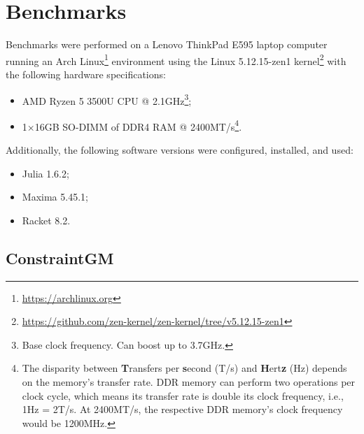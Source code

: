 %
\label{chap:eval}
\cleardoublepage{}

\section{Benchmarks}%
\label{sec:eval.perf}
Benchmarks were performed on a Lenovo ThinkPad E595 laptop computer running an
Arch Linux\footnote{\url{https://archlinux.org}} environment using the
Linux\textsuperscript{\textregistered} 5.12.15-zen1
kernel\footnote{\url{https://github.com/zen-kernel/zen-kernel/tree/v5.12.15-zen1}}
with the following hardware specifications:
%
\begin{itemize}
  \label{acro:AMD}
  \label{acro:CPU}
  \item \ac{AMD} Ryzen\textsuperscript{\texttrademark} 5 3500U \ac{CPU} @
  2.1GHz\footnote{Base clock frequency.  Can boost up to 3.7GHz.};
  \label{acro:SO-DIMM}
  \label{acro:DDR}
  \label{acro:RAM}
  \item 1×16GB \ac{SO-DIMM} of \ac{DDR}4 \ac{RAM} @ 2400MT/s\footnote{The
  disparity between \textbf{T}ransfers per \textbf{s}econd (T/s) and
  \textbf{H}ert\textbf{z} (Hz) depends on the memory's transfer rate.  \acf{DDR}
  memory can perform two operations per clock cycle, which means its transfer
  rate is double its clock frequency, i.e., 1Hz = 2T/s.  At 2400MT/s, the
  respective \ac{DDR} memory's clock frequency would be 1200MHz.}.
\end{itemize}
%
Additionally, the following software versions were configured, installed, and
used:
%
\begin{itemize}
  \item Julia 1.6.2;
  \item Maxima 5.45.1;
  \item Racket 8.2.
\end{itemize}

\subsection{ConstraintGM}%
\label{sec:eval.perf.cgm}

